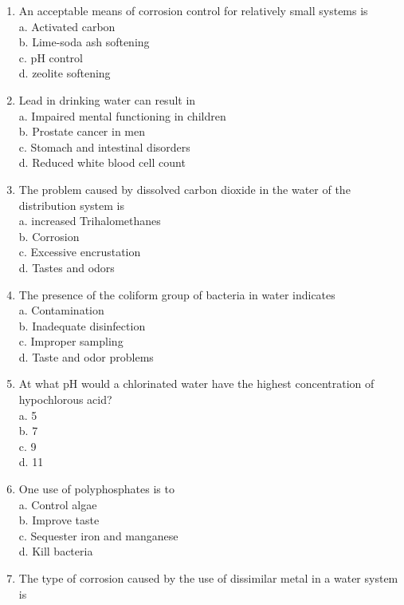 \begin{enumerate}
\item An acceptable means of corrosion control for relatively small systems is\\
a. Activated carbon\\
b. Lime-soda ash softening\\
c. $\mathrm{pH}$ control\\
d. zeolite softening\\
\item Lead in drinking water can result in\\
a. Impaired mental functioning in children\\
b. Prostate cancer in men\\
c. Stomach and intestinal disorders\\
d. Reduced white blood cell count\\
\item The problem caused by dissolved carbon dioxide in the water of the distribution system is\\
a. increased Trihalomethanes\\
b. Corrosion\\
c. Excessive encrustation\\
d. Tastes and odors\\
\item The presence of the coliform group of bacteria in water indicates\\
a. Contamination\\
b. Inadequate disinfection\\
c. Improper sampling\\
d. Taste and odor problems\\
\item At what $\mathrm{pH}$ would a chlorinated water have the highest concentration of hypochlorous acid?\\
a. 5\\
b. 7\\
c. 9\\
d. 11\\
\item One use of polyphosphates is to\\
a. Control algae\\
b. Improve taste\\
c. Sequester iron and manganese\\
d. Kill bacteria\\
\item The type of corrosion caused by the use of dissimilar metal in a water system is\\

\end{enumerate}
